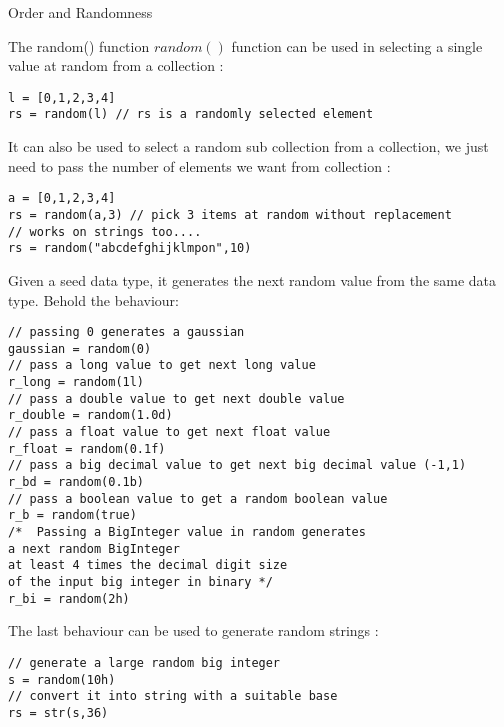 \begin{section}{Order and Randomness}
\begin{subsection}{The random() function}
$random()$ function can be used in selecting a single value at random from a collection :
\begin{lstlisting}[style=JexlStyle]
l = [0,1,2,3,4]
rs = random(l) // rs is a randomly selected element 
\end{lstlisting}  

It can also be used to select a random sub collection from a collection,
we just need to pass the number of elements we want from collection :

\begin{lstlisting}[style=JexlStyle]
a = [0,1,2,3,4]
rs = random(a,3) // pick 3 items at random without replacement 
// works on strings too....
rs = random("abcdefghijklmpon",10) 
\end{lstlisting}  

Given a seed data type, it generates the next random value from 
the same data type. Behold the behaviour: 

\begin{center}\begin{minipage}{\linewidth}
\begin{lstlisting}[style=JexlStyle]
// passing 0 generates a gaussian 
gaussian = random(0)
// pass a long value to get next long value 
r_long = random(1l)
// pass a double value to get next double value 
r_double = random(1.0d)
// pass a float value to get next float value 
r_float = random(0.1f)
// pass a big decimal value to get next big decimal value (-1,1) 
r_bd = random(0.1b)
// pass a boolean value to get a random boolean value 
r_b = random(true)
/*  Passing a BigInteger value in random generates 
a next random BigInteger
at least 4 times the decimal digit size 
of the input big integer in binary */
r_bi = random(2h)
\end{lstlisting}  
\end{minipage}\end{center}


The last behaviour can be used to generate random strings :

\begin{lstlisting}[style=JexlStyle]
// generate a large random big integer 
s = random(10h)
// convert it into string with a suitable base 
rs = str(s,36)
\end{lstlisting}


\end{subsection}

\end{section}
